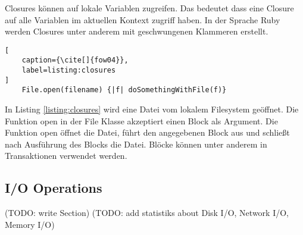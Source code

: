 Closures können auf lokale Variablen zugreifen. Das bedeutet dass eine Closure auf alle Variablen im aktuellen Kontext zugriff haben. In der Sprache Ruby werden Closures unter anderem mit geschwungenen Klammeren erstellt. \cite[]{fow04} 

\begin{lstlisting}[
	caption={\cite[]{fow04}},
	label=listing:closures
]
	File.open(filename) {|f| doSomethingWithFile(f)}
\end{lstlisting}

In Listing \ref{listing:closures} wird eine Datei vom lokalem Filesystem geöffnet. Die Funktion open in der File Klasse akzeptiert einen Block als Argument. Die Funktion open öffnet die Datei, führt den angegebenen Block aus und schließt nach Ausführung des Blocks die Datei. Blöcke können unter anderem in Transaktionen verwendet werden. \cite[]{fow04}


\subsection{I/O Operations}
(TODO: write Section)
(TODO: add statistiks about Disk I/O, Network I/O, Memory I/O)